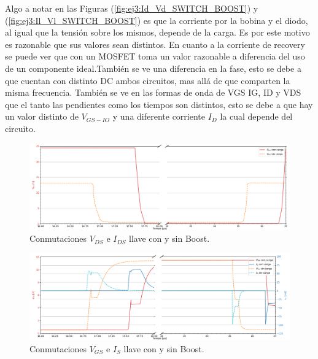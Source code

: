 Algo a notar en las Figuras (\ref{fig:ej3:Id_Vd_SWITCH_BOOST}) y (\ref{fig:ej3:Il_Vl_SWITCH_BOOST}) es que la corriente por la bobina y el diodo, al igual que la tensión sobre los mismos, depende de la carga. Es por este motivo es razonable que sus valores sean distintos. En cuanto a la corriente de recovery se puede ver que con un MOSFET toma un valor razonable a diferencia del uso de un componente ideal.También se ve una diferencia en la fase, esto se debe a que cuentan con distinto DC ambos circuitos, mas allá de que comparten la misma frecuencia. 
También se ve en las formas de onda de VGS IG, ID y VDS que el tanto las pendientes como los tiempos son distintos, esto se debe a que hay un valor distinto de $V_{GS-IO}$ y una diferente corriente $I_D$ la cual depende del circuito.
\begin{multicols}{2}
\begin{figure}[H]
	\centering
	\includegraphics[width=\linewidth]{ImagenesEjercicio-3/ids-vds-1v3}
	\caption{Conmutaciones $V_{DS}$ e  $I_{DS}$ llave con y sin Boost.}
	\label{fig:ej3:conmutacionON_OFF_VDS_IDS_SWITCH_BOOST}
\end{figure}
\begin{figure}[H]
	\centering
	\includegraphics[width=\linewidth]{ImagenesEjercicio-3/ig-vgs-1v3}
	\caption{Conmutaciones $V_{GS}$ e  $I_{S}$ llave con y sin Boost.}
	\label{fig:ej3:conmutacionON_OFF_VGS_IG_SWITCH_BOOST}
\end{figure}
\end{multicols}
